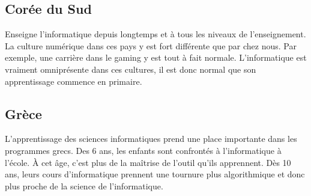 \subsection{Corée du Sud}
Enseigne l'informatique depuis longtemps et à tous les niveaux de l'enseignement. La culture numérique dans ces pays y est fort différente que par chez nous. Par exemple, une carrière dans le gaming y est tout à fait normale. L'informatique est vraiment omniprésente dans ces cultures, il est donc normal que son apprentissage commence en primaire.

\subsection{Grèce}
L'apprentissage des sciences informatiques prend une place importante dans les programmes grecs. Des 6 ans, les enfants sont confrontés à l'informatique à l'école. À cet âge, c'est plus de la maîtrise de l'outil qu'ils apprennent. Dès 10 ans, leurs cours d'informatique prennent une tournure plus algorithmique et donc plus proche de la science de l'informatique.
